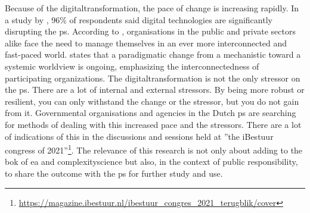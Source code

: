 Because of the \gls{digitaltransformation}, the pace of change is increasing rapidly. In a study by \textcite{Eggers2015}, 96\% of respondents said digital technologies are significantly disrupting the \gls{ps}. According to \textcite{Nurmi2021}, organisations in the public and private sectors alike face the need to manage themselves in an ever more interconnected and fast-paced world. \textcite{Guggenberger2020} states that a paradigmatic change from a mechanistic toward a systemic worldview is ongoing, emphasizing the interconnectedness of participating organizations. The \gls{digitaltransformation} is not the only \gls{stressor} on the \gls{ps}. There are a lot of internal and external \glspl{stressor}. By being more \gls{robust} or \gls{resilient}, you can only withstand the change or the \gls{stressor}, but you do not gain from it. Governmental organisations and agencies in the Dutch \gls{ps} are searching for methods of dealing with this increased pace and the stressors. There are a lot of indications of this in the discussions and sessions held at ''the iBestuur congress of 2021''\footnote{\url{https://magazine.ibestuur.nl/ibestuur_congres_2021_terugblik/cover}}. The relevance of this research is not only about adding to the \acrshort{bok} of \acrshort{ea} and \gls{complexityscience} but also, in the context of public responsibility, to share the outcome with the \gls{ps} for further study and use.